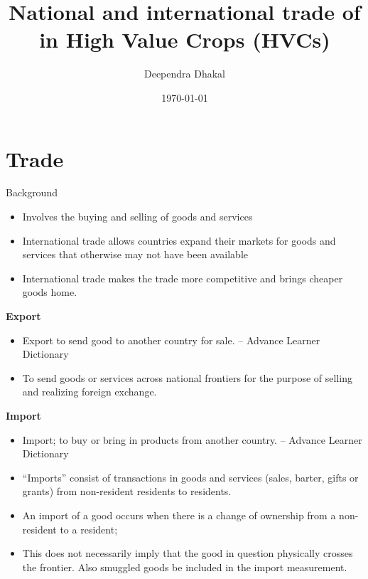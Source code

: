 \documentclass[12pt,ignorenonframetext,aspectratio=169]{beamer}
\title{\insertsectionhead}
  {
    \definecolor{white}{rgb}{0.776,0.357,0.157}
    \definecolor{iqss@orange}{rgb}{1,1,1}
    \ifnum \insertmainframenumber > \insertframenumber
    \frame{
      \frametitle{\iqsssectiontitleheader}
      \tableofcontents[currentsection]
    }
    \else
    \frame{
      \frametitle{Backup Slides}
      \tableofcontents[sectionstyle=shaded/shaded,subsectionstyle=shaded/shaded/shaded]
    }
    \fi
  }
\title[]{National and international trade of in High Value Crops
(HVCs)}
\author[
        Deependra Dhakal
    ]{Deependra Dhakal}
\institute[
    ]{
    GAASC, Baitadi \and Tribhuwan University
    }
\date[
      \today
  ]{
      \today
        }
\providecommand{\tightlist}{%
  \setlength{\itemsep}{0pt}\setlength{\parskip}{0pt}}
\begin{document}
  \begin{frame}[plain]
  \titlepage
  \end{frame}



\hypertarget{trade}{%
\section{Trade}\label{trade}}

\begin{frame}{Background}
\protect\hypertarget{background}{}
\begin{itemize}
\tightlist
\item
  Involves the buying and selling of goods and services
\item
  International trade allows countries expand their markets for goods
  and services that otherwise may not have been available
\item
  International trade makes the trade more competitive and brings
  cheaper goods home.
\end{itemize}
\end{frame}

\begin{frame}{}
\protect\hypertarget{section}{}
\textbf{Export}

\begin{itemize}
\tightlist
\item
  Export to send good to another country for sale. -- Advance Learner
  Dictionary
\item
  To send goods or services across national frontiers for the purpose of
  selling and realizing foreign exchange.
\end{itemize}

\textbf{Import}

\begin{itemize}
\tightlist
\item
  Import; to buy or bring in products from another country. -- Advance
  Learner Dictionary
\item
  ``Imports'' consist of transactions in goods and services (sales,
  barter, gifts or grants) from non-resident residents to residents.
\item
  An import of a good occurs when there is a change of ownership from a
  non-resident to a resident;
\item
  This does not necessarily imply that the good in question physically
  crosses the frontier. Also smuggled goods be included in the import
  measurement.
\end{itemize}
\end{frame}
\end{document}
